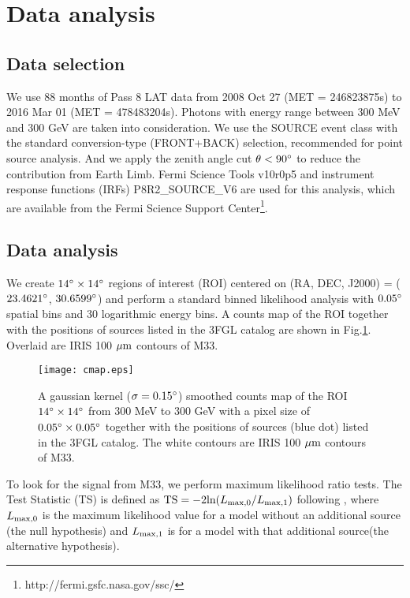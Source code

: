 \documentclass[useAMS,usenatbib,referee]{mn2e}
\begin{document}
\section{Data analysis}
\subsection{Data selection}

We use 88 months of Pass 8 LAT data from 2008 Oct 27 (MET = 246823875s) to 2016 Mar 01 (MET = 478483204s). Photons with energy range between 300 MeV and 300 GeV are taken into consideration. We use the SOURCE event class with the standard conversion-type (FRONT+BACK) selection, recommended for point source analysis. And we apply the zenith angle cut ${\rm \theta} < 90^{\rm \circ}$ to reduce the contribution from Earth Limb. Fermi Science Tools v10r0p5 and instrument response functions (IRFs) P8R2\_SOURCE\_V6 are used for this analysis, which are available from the Fermi Science Support Center\footnote{http://fermi.gsfc.nasa.gov/ssc/}.


\subsection{Data analysis}

We create $14^{\rm \circ} \times 14^{\rm \circ}$ regions of interest (ROI) centered on (RA, DEC, J2000) = ($23.4621^{\rm \circ}$, $30.6599^{\rm \circ}$) and perform a standard binned likelihood analysis with $0.05^{\rm \circ}$ spatial bins and 30 logarithmic energy bins. A counts map of the ROI together with the positions of sources listed in the 3FGL catalog \citep{aaa+2015} are shown in Fig.\ref{counts map}. Overlaid are IRIS 100 ${\rm \mu m}$ contours of M33.

\begin{figure}%
\texttt{[image: cmap.eps]}
\caption{A gaussian kernel (${\rm \sigma} = 0.15^{\rm \circ}$) smoothed counts map of the ROI $14^{\rm \circ} \times 14^{\rm \circ}$ from 300 MeV to 300 GeV with a pixel size of $0.05^{\rm \circ} \times 0.05^{\rm \circ}$ together with the positions of sources (blue dot) listed in the 3FGL catalog. The white contours are IRIS 100 ${\rm \mu m}$ contours of M33.}
\label{counts map}
\end{figure}

To look for the signal from M33, we perform maximum likelihood ratio tests. The Test Statistic (TS) is defined as ${\rm TS = -2ln(}L_{\rm max,0}/L_{\rm max,1})$ following \citet{mbc+1996}, where $L_{\rm max,0}$ is the maximum likelihood value for a model without an additional source (the null hypothesis) and $L_{\rm max,1}$ is for a model with that additional source(the alternative hypothesis).
\end{document}
